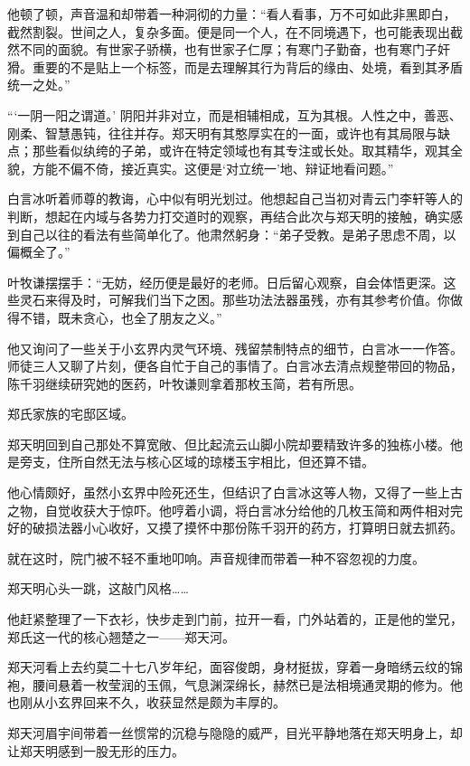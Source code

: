 他顿了顿，声音温和却带着一种洞彻的力量：“看人看事，万不可如此非黑即白，截然割裂。世间之人，复杂多面。便是同一个人，在不同境遇下，也可能表现出截然不同的面貌。有世家子骄横，也有世家子仁厚；有寒门子勤奋，也有寒门子奸猾。重要的不是贴上一个标签，而是去理解其行为背后的缘由、处境，看到其矛盾统一之处。”

“‘一阴一阳之谓道。’ 阴阳并非对立，而是相辅相成，互为其根。人性之中，善恶、刚柔、智慧愚钝，往往并存。郑天明有其憨厚实在的一面，或许也有其局限与缺点；那些看似纨绔的子弟，或许在特定领域也有其专注或长处。取其精华，观其全貌，方能不偏不倚，接近真实。这便是‘对立统一’地、辩证地看问题。”

白言冰听着师尊的教诲，心中似有明光划过。他想起自己当初对青云门李轩等人的判断，想起在内域与各势力打交道时的观察，再结合此次与郑天明的接触，确实感到自己以往的看法有些简单化了。他肃然躬身：“弟子受教。是弟子思虑不周，以偏概全了。”

叶牧谦摆摆手：“无妨，经历便是最好的老师。日后留心观察，自会体悟更深。这些灵石来得及时，可解我们当下之困。那些功法法器虽残，亦有其参考价值。你做得不错，既未贪心，也全了朋友之义。”

他又询问了一些关于小玄界内灵气环境、残留禁制特点的细节，白言冰一一作答。师徒三人又聊了片刻，便各自忙于自己的事情了。白言冰去清点规整带回的物品，陈千羽继续研究她的医药，叶牧谦则拿着那枚玉简，若有所思。

\vspace{2em}

郑氏家族的宅邸区域。

郑天明回到自己那处不算宽敞、但比起流云山脚小院却要精致许多的独栋小楼。他是旁支，住所自然无法与核心区域的琼楼玉宇相比，但还算不错。

他心情颇好，虽然小玄界中险死还生，但结识了白言冰这等人物，又得了一些上古之物，自觉收获大于惊吓。他哼着小调，将白言冰分给他的几枚玉简和两件相对完好的破损法器小心收好，又摸了摸怀中那份陈千羽开的药方，打算明日就去抓药。

就在这时，院门被不轻不重地叩响。声音规律而带着一种不容忽视的力度。

郑天明心头一跳，这敲门风格……

他赶紧整理了一下衣衫，快步走到门前，拉开一看，门外站着的，正是他的堂兄，郑氏这一代的核心翘楚之一——郑天河。

郑天河看上去约莫二十七八岁年纪，面容俊朗，身材挺拔，穿着一身暗绣云纹的锦袍，腰间悬着一枚莹润的玉佩，气息渊深绵长，赫然已是法相境通灵期的修为。他也刚从小玄界回来不久，收获显然是颇为丰厚的。

郑天河眉宇间带着一丝惯常的沉稳与隐隐的威严，目光平静地落在郑天明身上，却让郑天明感到一股无形的压力。

